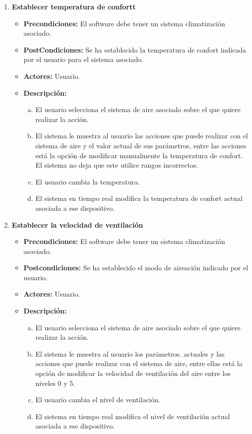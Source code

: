 \begin{enumerate}
    \item \textbf{Establecer temperatura de confortt}
    \begin{itemize}
        \item \textbf{Precondiciones:} El software debe tener un sistema climatización asociado.
    \item \textbf{PostCondiciones:} Se ha establecido la temperatura de confort indicada por el usuario para el sistema asociado.
    \item \textbf{Actores:} Usuario.
    \item \textbf{Descripción:}
    \begin{enumerate}[a.]
        \item El usuario selecciona el sistema de aire asociado sobre el que quiere realizar la acción.
        \item El sistema le muestra al usuario las acciones que puede realizar con el sistema de aire y el valor actual de sus parámetros, entre las acciones está la opción de modificar manualmente la temperatura de confort. El sistema no deja que este utilice rangos incorrectos.
        \item El usuario cambia la temperatura.
        \item El sistema en tiempo real modifica la temperatura de confort actual asociada a ese dispositivo.
    \end{enumerate}
    \end{itemize}

    \item \textbf{Establecer la velocidad de ventilación}
    \begin{itemize}
        \item \textbf{Precondiciones:} El software debe tener un sistema climatización asociado.
    \item \textbf{Postcondiciones:} Se ha establecido el modo de aireación indicado por el usuario.
    \item \textbf{Actores:} Usuario.
    \item \textbf{Descripción:}
    \begin{enumerate}[a.]
        \item El usuario selecciona el sistema de aire asociado sobre el que quiere realizar la acción.
        \item El sistema le muestra al usuario los parámetros. actuales y las acciones que puede realizar con el sistema de aire, entre ellas está la opción de modificar la velocidad de ventilación del aire entre los niveles 0 y 5.
        \item El usuario cambia el nivel de ventilación.
        \item El sistema en tiempo real modifica el nivel de ventilación actual asociada a ese dispositivo.
    \end{enumerate}
    \end{itemize}


\end{enumerate}
